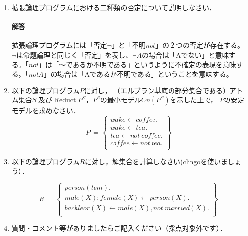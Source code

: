 \documentclass[dvipdfmx]{jsarticle}
\begin{document}
\begin{enumerate}
\item 拡張論理プログラムにおける二種類の否定について説明しなさい．
\paragraph{解答}拡張論理プログラムには「否定$\neg$」と「不明$not$」の２つの否定が存在する。$\neg$は命題論理と同じく「否定」を表し、$\neg A$の場合は「Aでない」と意味する。「$not$」は「〜であるか不明である」というように不確定の表現を意味する。「$not A$」の場合は「Aであるか不明である」ということを意味する。



\item 以下の論理プログラム$P$に対し，
  （エルブラン基底の部分集合である）アトム集合$S$
  及び Reduct $P^S$，$P^S$の最小モデル$Cn(P^S)$を示した上で，
  $P$の安定モデルを求めなさい．
  \[
  P\,=\,\left\{
  \begin{array}{l}
    wake \leftarrow coffee.\\
    wake \leftarrow tea.\\
    tea \leftarrow not~ coffee.\\
    coffee \leftarrow not~ tea.\\
  \end{array}
  \right\}
  \]

\item 以下の論理プログラム$R$に対し，解集合を計算しなさい(clingoを使いましょう）．

  \[
  R\,=\,\left\{
  \begin{array}{l}
    person(tom).\\
    male(X);female(X)\leftarrow person(X).\\
    bachleor(X)\leftarrow male(X), not~ married(X).\\
  \end{array}
  \right\}
  \]


\item 質問・コメント等がありましたらご記入ください（採点対象外です）．
\end{enumerate}
\end{document}
